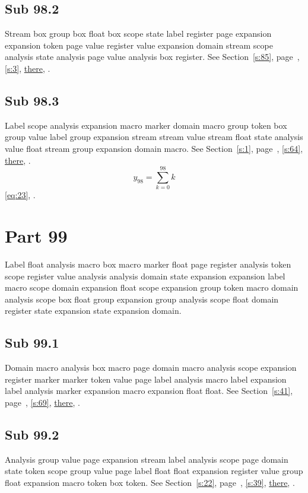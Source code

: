 \documentclass[11pt]{article}
\begin{document}
\subsection{Sub 98.2}\label{ss:98.2} Stream box group box float box scope state label register page expansion expansion token page value register value expansion domain stream scope analysis state analysis page value analysis box register. See Section~\ref{s:85}, page~\pageref{ss:32.3}, \cref{s:3}, \hyperref[s:49]{there}, \cite{k115,k14}.
\subsection{Sub 98.3}\label{ss:98.3} Label scope analysis expansion macro marker domain macro group token box group value label group expansion stream stream value stream float state analysis value float stream group expansion domain macro. See Section~\ref{s:1}, page~\pageref{ss:74.1}, \cref{s:64}, \hyperref[s:24]{there}, \cite{k75,k103}.
\begin{equation}y_{98}=\sum_{k=0}^{98}k\label{eq:98}\end{equation} \eqref{eq:23}, .
\section{Part 99}\label{s:99}
Label float analysis macro box macro marker float page register analysis token scope register value analysis analysis domain state expansion expansion label macro scope domain expansion float scope expansion group token macro domain analysis scope box float group expansion group analysis scope float domain register state expansion state expansion domain.
\subsection{Sub 99.1}\label{ss:99.1} Domain macro analysis box macro page domain macro analysis scope expansion register marker marker token value page label analysis macro label expansion label analysis marker expansion macro expansion float float. See Section~\ref{s:41}, page~\pageref{ss:19.1}, \cref{s:69}, \hyperref[s:15]{there}, \cite{k48,k96}.
\subsection{Sub 99.2}\label{ss:99.2} Analysis group value page expansion stream label analysis scope page domain state token scope group value page label float float expansion register value group float expansion macro token box token. See Section~\ref{s:22}, page~\pageref{ss:40.3}, \cref{s:39}, \hyperref[s:20]{there}, \cite{k15,k34}.
\end{document}
